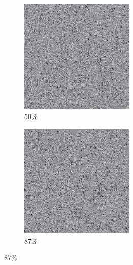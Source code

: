 \documentclass[12pt, fleqn]{report}                             %
\theoremstyle{break}                                            %
\begin{document}
\begin{figure}[ht!]
\begin{subfigure}[b]{0.4\linewidth}
          \includegraphics[width=0.6\textwidth]{Images/45/c.png}
          \caption{50\%}
        \end{subfigure}
        \begin{subfigure}[b]{0.4\linewidth}
          \includegraphics[width=0.6\textwidth]{Images/45/d.png}
          \caption{87\%}
        \end{subfigure}
      \end{figure}
\end{document}
